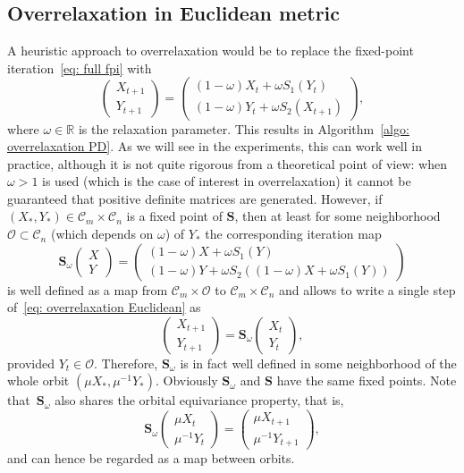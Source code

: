 \documentclass[a4paper]{article}
\newcommand{\bS}{\mathbf{S}}
\newcommand{\caC}{\mathcal{C}}
\theoremstyle{definition}
\numberwithin{equation}{section}
\begin{document}
\subsection{Overrelaxation in Euclidean metric}\label{sec: overrelaxation Euclidean}

A heuristic approach to overrelaxation would be to replace the fixed-point iteration~\eqref{eq: full fpi} with
\begin{equation}\label{eq: overrelaxation Euclidean}
 \begin{pmatrix} X_{t+1} \\ Y_{t+1} \end{pmatrix} =  \begin{pmatrix} (1-\omega) X_t + \omega S_1(Y_t) \\ (1-\omega) Y_t + \omega S_2(X_{t+1}) \end{pmatrix},
\end{equation}
where $\omega \in \mathbb R$ is the relaxation parameter. This results in Algorithm~\ref{algo: overrelaxation PD}. As we will see in the experiments, this can work well in practice, although it is not quite rigorous from a theoretical point of view: when $\omega > 1$ is used (which is the case of interest in overrelaxation) it cannot be guaranteed that positive definite matrices are generated. However, if $(X_*,Y_*) \in \caC_m \times \caC_n$ is a fixed point of $\bS$, then at least for some neighborhood $\mathcal O \subset \caC_n$ (which depends on $\omega$) of $Y_*$ the corresponding iteration map
\[
 \bS_\omega\!\begin{pmatrix} X \\ Y \end{pmatrix} =  \begin{pmatrix} (1-\omega) X + \omega S_1(Y) \\ (1-\omega) Y + \omega S_2((1-\omega) X + \omega S_1(Y)) \end{pmatrix}
\]
is well defined as a map from $\caC_m \times \mathcal O$ to $\caC_m \times \caC_n$ and allows to write a single step of~\eqref{eq: overrelaxation Euclidean} as
\[
 \begin{pmatrix} X_{t+1} \\ Y_{t+1} \end{pmatrix} = \bS_\omega\!\begin{pmatrix} X_{t} \\ Y_{t} \end{pmatrix},
\]
provided $Y_t \in \mathcal O$. Therefore, $\bS_\omega$ is in fact well defined in some neighborhood of the whole orbit $(\mu X_*, \mu^{-1} Y_*)$. Obviously $\bS_\omega$ and $\bS$ have the same fixed points. Note that~$\bS_\omega$ also shares the orbital equivariance property, that is,
\begin{equation}\label{eq: orbital equivariance relaxation}
 \bS_\omega\!\begin{pmatrix} \mu X_{t} \\ \mu^{-1}Y_{t} \end{pmatrix} = \begin{pmatrix} \mu X_{t+1} \\ \mu^{-1}Y_{t+1} \end{pmatrix},
\end{equation}
and can hence be regarded as a map between orbits.
\end{document}
